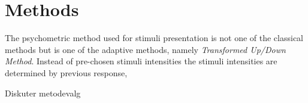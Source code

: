 \section*{Methods}
\label{Methods}
%
The psychometric method used for stimuli presentation is not one of the classical methods but is one of the adaptive methods, namely \textit{Transformed Up/Down Method}. Instead of pre-chosen stimuli intensities the stimuli intensities are determined by previous response,    













Diskuter metodevalg